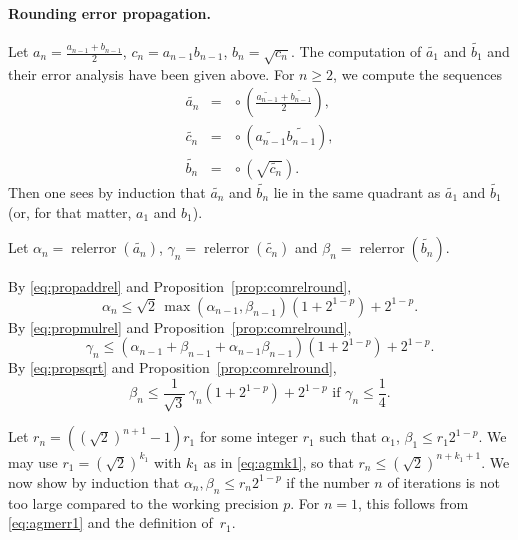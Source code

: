 \documentclass [11pt]{article}
\newcommand {\corr}[1]{{#1}}
\newcommand {\appro}[1]{\widetilde {#1}}
\newcommand{\relerror}{\operatorname {relerror}}
\newcommand {\round}{\operatorname {\circ}}
\renewcommand {\leq}{\leqslant}
\renewcommand {\geq}{\geqslant}
\begin{document}
\paragraph {Rounding error propagation.}

Let
$\corr {a_n} = \frac {\corr {a_{n-1}} + \corr {b_{n-1}}}{2}$,
$\corr {c_n} = \corr {a_{n-1}} \corr {b_{n-1}}$,
$\corr {b_n} = \sqrt {\corr {c_n}}$.
The computation of $\appro {a_1}$ and $\appro {b_1}$ and their error
analysis have been given above.
For $n \geq 2$, we compute the sequences
\begin {eqnarray*}
\appro {a_n}
& = & \round \left( \frac {\appro {a_{n-1}} + \appro {b_{n-1}}}{2} \right), \\
\appro {c_n}
& = & \round \left( \appro {a_{n-1}} \appro {b_{n-1}} \right), \\
\appro {b_n}
& = & \round \left( \sqrt {\appro {c_n}} \right).
\end {eqnarray*}
Then one sees by induction that
$\appro {a_n}$ and $\appro {b_n}$ lie in the same quadrant as
$\appro {a_1}$ and $\appro {b_1}$
(or, for that matter, $\corr {a_1}$ and $\corr {b_1}$).

Let $\alpha_n = \relerror (\appro {a_n})$,
$\gamma_n = \relerror (\appro {c_n})$ and
$\beta_n = \relerror (\appro {b_n})$.

\noindent
By \eqref {eq:propaddrel} and Proposition~\ref {prop:comrelround},
\begin {equation}
\label {eq:agmalpha}
\alpha_n \leq
\sqrt 2 \, \max (\alpha_{n-1}, \beta_{n-1})
\left( 1 + 2^{1-p} \right) + 2^{1-p}.
\end {equation}
By \eqref {eq:propmulrel} and Proposition~\ref {prop:comrelround},
\begin {equation}
\label {eq:agmgamma}
\gamma_n \leq
\left( \alpha_{n-1} + \beta_{n-1} + \alpha_{n-1} \beta_{n-1} \right)
\left( 1 + 2^{1-p} \right) + 2^{1-p}.
\end {equation}
By \eqref {eq:propsqrt} and Proposition~\ref {prop:comrelround},
\begin {equation}
\label {eq:agmbeta}
\beta_n \leq
\frac {1}{\sqrt 3} \, \gamma_n (1 + 2^{1-p}) + 2^{1-p}
\text { if } \gamma_n \leq \frac {1}{4}.
\end {equation}

Let $r_n = \left( (\sqrt 2)^{n+1} - 1 \right) r_1$ for some integer $r_1$
such that $\alpha_1$, $\beta_1 \leq r_1 2^{1-p}$.
We may use $r_1 = (\sqrt 2)^{k_1}$ with $k_1$ as in \eqref {eq:agmk1},
so that $r_n \leq (\sqrt 2)^{n + k_1 + 1}$.
We now show by induction that
$\alpha_n, \beta_n \leq r_n 2^{1-p}$
if the number $n$ of iterations is not too large compared to
the working precision $p$.
For $n=1$, this follows from \eqref {eq:agmerr1} and the definition
of~$r_1$.
\end{document}
